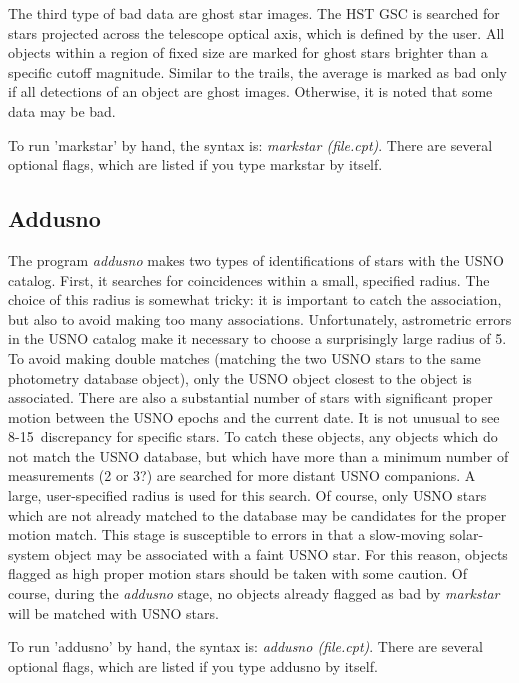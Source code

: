 \documentclass{article}
\newcommand\pr{\em}                   %
\begin{document}
The third type of bad data are ghost star images.  The HST GSC is
searched for stars projected across the telescope optical axis, which
is defined by the user.  All objects within a region of fixed size are
marked for ghost stars brighter than a specific cutoff magnitude.
Similar to the trails, the average is marked as bad only if all
detections of an object are ghost images.  Otherwise, it is noted that
some data may be bad.

To run 'markstar' by hand, the syntax is: {\pr markstar (file.cpt)}.
There are several optional flags, which are listed if you type
markstar by itself.

\subsection{Addusno}

The program {\pr addusno} makes two types of identifications of stars
with the USNO catalog.  First, it searches for coincidences within a
small, specified radius.  The choice of this radius is somewhat
tricky: it is important to catch the association, but also to avoid
making too many associations.  Unfortunately, astrometric errors in
the USNO catalog make it necessary to choose a surprisingly large
radius of 5\asec.  To avoid making double matches (matching the two
USNO stars to the same photometry database object), only the USNO
object closest to the object is associated.  There are also a
substantial number of stars with significant proper motion between the
USNO epochs and the current date.  It is not unusual to see 8-15\asec\ 
discrepancy for specific stars.  To catch these objects, any objects
which do not match the USNO database, but which have more than a
minimum number of measurements (2 or 3?) are searched for more distant
USNO companions.  A large, user-specified radius is used for this
search.  Of course, only USNO stars which are not already matched to
the database may be candidates for the proper motion match.  This
stage is susceptible to errors in that a slow-moving solar-system
object may be associated with a faint USNO star.  For this reason,
objects flagged as high proper motion stars should be taken with some
caution.  Of course, during the {\pr addusno} stage, no objects
already flagged as bad by {\pr markstar} will be matched with USNO
stars.  

To run 'addusno' by hand, the syntax is: {\pr addusno (file.cpt)}.
There are several optional flags, which are listed if you type
addusno by itself.
\end{document}
